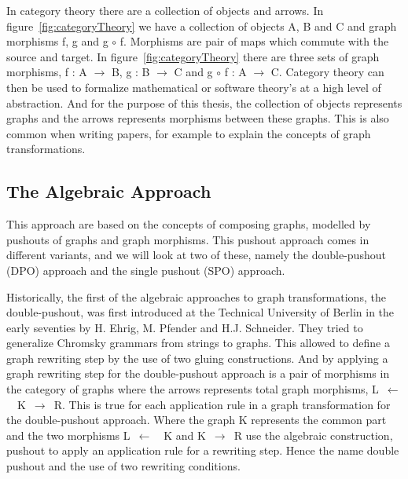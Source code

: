 In category theory there are a collection of objects and arrows. In
figure~\ref{fig:categoryTheory} we have a collection of objects A, B and C and
graph morphisms f, g and g $\circ$ f. Morphisms are pair of maps which commute
with the source and target\cite{Brown2008}. In figure~\ref{fig:categoryTheory}
there are three sets of graph morphisms, f : A $\longrightarrow$ B, g : B
$\longrightarrow$ C and g $\circ$ f : A $\longrightarrow$ C.  Category theory
can then be used to formalize mathematical or software theory's at a high level of abstraction. And
for the purpose of this thesis, the collection of objects represents graphs and
the arrows represents morphisms between these graphs. This is also common when
writing papers, for example to explain the concepts of graph transformations.

\subsection{The Algebraic Approach}
This approach are based on the concepts of composing graphs, modelled
by pushouts of graphs and graph morphisms. This pushout approach comes in
different variants, and we will look at two of these, namely the
double-pushout (DPO) approach and the single pushout (SPO)
approach\cite{Loewe1997,Ehrig1997}.

Historically, the first of the algebraic approaches to graph
transformations, the double-pushout, was first introduced at the Technical
University of Berlin in the early seventies by H. Ehrig, M. Pfender and H.J.
Schneider\cite{INSPEC:606170}. They tried to generalize Chromsky grammars from
strings to graphs. This allowed to define a graph rewriting step by the use of
two gluing constructions. And by applying a graph rewriting step for the
double-pushout approach is a pair of morphisms in the category of graphs where
the arrows represents total graph morphisms, \mbox{L $\longleftarrow$
\ K $\longrightarrow$ R}. This is true for each application rule in a graph
transformation for the double-pushout approach. Where the graph K represents the
common part and the two morphisms \mbox{L $\longleftarrow$ \ K} and \mbox{K
$\longrightarrow$ R} use the algebraic construction, pushout to apply an
application rule for a rewriting step. Hence the name double pushout and the use
of two rewriting conditions.

